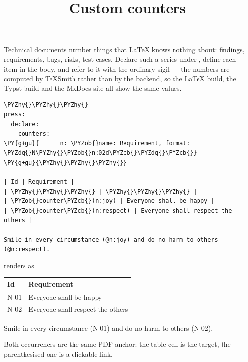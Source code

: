 \documentclass[a4paper,twoside]{article}
\title{Custom counters}
\author{}\date{}
\begin{document}
\maketitle
Technical documents number things that \LaTeX{} knows nothing about: findings,
requirements, bugs, risks, test cases. Declare such a series under
, define each item in the body, and refer to it with
the ordinary  sigil --- the numbers are computed by TeXSmith rather than by
the backend, so the \LaTeX{} build, the Typst build and the MkDocs site all show
the same values.
\begin{tscode}[lang=md, engine=pygments]
\begin{Verbatim}[commandchars=\\\{\},breaklines, breakanywhere, commandchars=\\\{\}]
\PYZhy{}\PYZhy{}\PYZhy{}
press:
  declare:
    counters:
\PY{g+gu}{      n: \PYZob{}name: Requirement, format: \PYZdq{}N\PYZhy{}\PYZob{}n:02d\PYZcb{}\PYZdq{}\PYZcb{}}
\PY{g+gu}{\PYZhy{}\PYZhy{}\PYZhy{}}

| Id | Requirement |
| \PYZhy{}\PYZhy{}\PYZhy{} | \PYZhy{}\PYZhy{}\PYZhy{} |
| \PYZob{}counter\PYZcb{}(n:joy) | Everyone shall be happy |
| \PYZob{}counter\PYZcb{}(n:respect) | Everyone shall respect the others |

Smile in every circumstance (@n:joy) and do no harm to others (@n:respect).
\end{Verbatim}
\end{tscode}
renders as
\begin{center}
\begin{tabularx}{\linewidth}{>{\raggedright\arraybackslash}X>{\raggedright\arraybackslash}X}
\toprule
\textbf{Id} & \textbf{Requirement} \\
\midrule
N-01 & Everyone shall be happy \\
N-02 & Everyone shall respect the others \\
\bottomrule
\end{tabularx}
\end{center}
Smile in every circumstance (N-01) and do no harm to others (N-02).

Both  occurrences are the same PDF anchor: the table cell is the target,
the parenthesised one is a clickable link.
\end{document}
